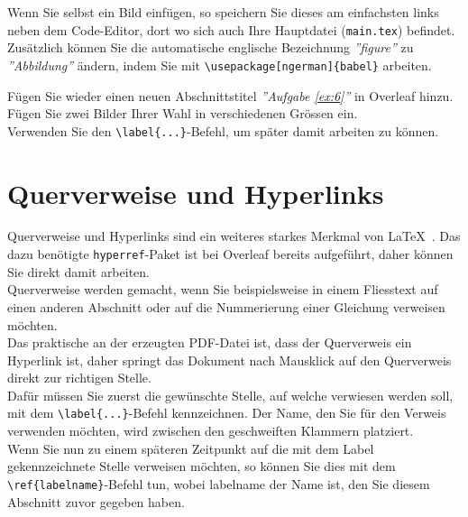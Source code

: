 \noindent Wenn Sie selbst ein Bild einfügen, so speichern Sie dieses am einfachsten links neben dem Code-Editor, dort wo sich auch Ihre Hauptdatei (\verb|main.tex|) befindet.\\ Zusätzlich können Sie die automatische englische Bezeichnung \emph{''figure''} zu \emph{''Abbildung''} ändern, indem Sie mit \verb|\usepackage[ngerman]{babel}| arbeiten.

\begin{ex}\label{ex:6}
Fügen Sie wieder einen neuen Abschnittstitel \emph{''Aufgabe \ref{ex:6}''}  in Overleaf hinzu.\\
Fügen Sie zwei Bilder Ihrer Wahl in verschiedenen Grössen ein.\\Verwenden Sie den \verb|\label{...}|-Befehl, um später damit arbeiten zu können.
\end{ex}

\newpage
\section{Querverweise und Hyperlinks}
Querverweise und Hyperlinks sind ein weiteres starkes Merkmal von \LaTeX\ . Das dazu benötigte \texttt{hyperref}-Paket ist bei Overleaf bereits aufgeführt, daher können Sie direkt damit arbeiten.\\
Querverweise werden gemacht, wenn Sie beispielsweise in einem Fliesstext auf einen anderen Abschnitt oder auf die Nummerierung einer Gleichung verweisen möchten.\\ Das praktische an der erzeugten PDF-Datei ist, dass der Querverweis ein Hyperlink ist, daher springt das Dokument nach Mausklick auf den Querverweis direkt zur richtigen Stelle.
\vspace{2mm}\\
Dafür müssen Sie zuerst die gewünschte Stelle, auf welche verwiesen werden soll, mit dem \verb|\label{...}|-Befehl kennzeichnen. Der Name, den Sie für den Verweis verwenden möchten, wird zwischen den geschweiften Klammern platziert. \\
Wenn Sie nun zu einem späteren Zeitpunkt auf die mit dem Label gekennzeichnete Stelle verweisen möchten, so können Sie dies mit dem \verb|\ref{labelname}|-Befehl tun, wobei labelname der Name ist, den Sie diesem Abschnitt zuvor gegeben haben.

